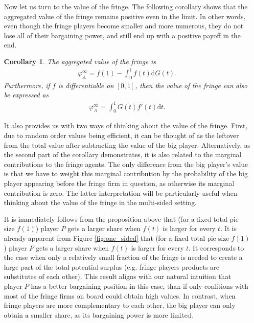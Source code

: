 \documentclass[a4paper]{article}
\newtheorem{corollary}{Corollary}
\newcommand{\dt}{\mathrm{d}t}
\newcommand{\dG}{\mathrm{d}G}
\begin{document}
Now let us turn to the value of the fringe.
The following corollary shows that the aggregated value of the fringe remains positive even in the limit.
In other words, even though the fringe players become smaller and more numerous, they do not lose all of their bargaining power, and still end up with a positive payoff in the end.
\begin{corollary}
    \label{cor:fringe_value_general}
    The aggregated value of the fringe is
    \begin{align*}
        \varphi_A^\infty = f(1) - \int_0^1 f(t) \dG(t).
    \end{align*}
    Furthermore, if $f$ is differentiable on $[0, 1]$, then the value of the fringe can also be expressed as
    \begin{align*}
        \varphi_A^\infty = \int_0^1 G(t) f'(t) \dt.
    \end{align*}
\end{corollary}

It also provides us with two ways of thinking about the value of the fringe.
First, due to random order values being efficient, it can be thought of as the leftover from the total value after subtracting the value of the big player.
Alternatively, as the second part of the corollary demonstrates, it is also related to the marginal contributions to the fringe agents.
The only difference from the big player's value is that we have to weight this marginal contribution by the probability of the big player appearing before the fringe firm in question, as otherwise its marginal contribution is zero.
The latter interpretation will be particularly useful when thinking about the value of the fringe in the multi-sided setting.

It is immediately follows from the proposition above that (for a fixed total pie size $f(1)$) player $P$ gets a larger share when $f(t)$ is larger for every $t$.
It is already apparent from Figure \ref{fig:one_sided} that (for a fixed total pie size $f(1)$) player $P$ gets a larger share when $f(t)$ is larger for every $t$.
It corresponds to the case when only a relatively small fraction of the fringe is needed to create a large part of the total potential surplus (e.g. fringe players products are substitutes of each other).
This result aligns with our natural intuition that player $P$ has a better bargaining position in this case, than if only coalitions with most of the fringe firms on board could obtain high values.
In contrast, when fringe players are more complementary to each other, the big player can only obtain a smaller share, as its bargaining power is more limited.
\end{document}
